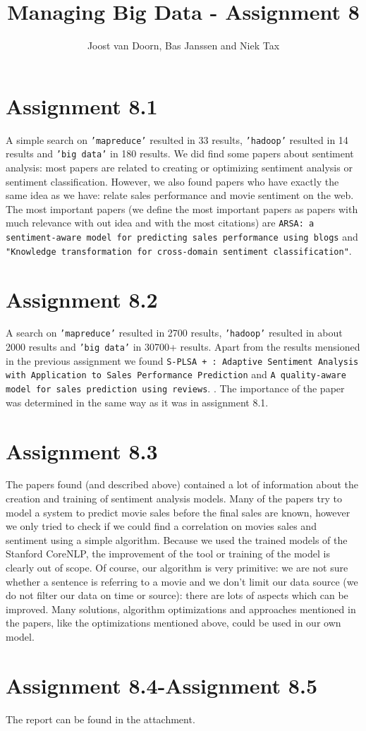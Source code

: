 \documentclass[]{article}
\title{Managing Big Data - Assignment 8}
\author{Joost van Doorn, Bas Janssen and Niek Tax}
\begin{document}
\maketitle

\section*{Assignment 8.1}
A simple search on \texttt{'mapreduce'} resulted in 33 results, \texttt{'hadoop'} resulted in 14 results and \texttt{'big data'} in 180 results. We did find some papers about sentiment analysis: most papers are related to creating or optimizing sentiment analysis or sentiment classification. However, we also found papers who have exactly the same idea as we have: relate sales performance and movie sentiment on the web. The most important papers (we define the most important papers as papers with much relevance with out idea and with the most citations) are \texttt{ARSA: a sentiment-aware model for predicting sales performance using blogs}\cite{Liu2007} and \texttt{"Knowledge transformation for cross-domain sentiment classification"}\cite{Li2009}.

\section*{Assignment 8.2}
A search on \texttt{'mapreduce'} resulted in 2700 results, \texttt{'hadoop'} resulted in about 2000 results and \texttt{'big data'} in 30700+ results. Apart from the results mensioned in the previous assignment we found \texttt{S-PLSA + : Adaptive Sentiment Analysis with Application to Sales Performance Prediction}\cite{Liu} and \texttt{A quality-aware model for sales prediction using reviews}. \cite{Yu2010}. The importance of the paper was determined in the same way as it was in assignment 8.1.

\section*{Assignment 8.3}
The papers found (and described above) contained a lot of information about the creation and training of sentiment analysis models. Many of the papers try to model a system to predict movie sales before the final sales are known, however we only tried to check if we could find a correlation on movies sales and sentiment using a simple algorithm. Because we used the trained models of the Stanford CoreNLP, the improvement of the tool or training of the model is clearly out of scope. Of course, our algorithm is very primitive: we are not sure whether a sentence is referring to a movie and we don't limit our data source (we do not filter our data on time or source): there are lots of aspects which can be improved. Many solutions, algorithm optimizations and approaches mentioned in the papers, like the optimizations mentioned above, could be used in our own model.

\section*{Assignment 8.4-Assignment 8.5}
The report can be found in the attachment.





\end{document}
